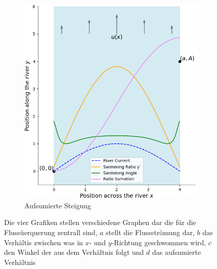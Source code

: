 \begin{figure}
\begin{subfigure}{0.48\textwidth}
        \includegraphics[width=\textwidth]{papers/schwimmen/Grafiken/Figure_5-crop.png}	
        \caption{Aufsumierte Steigung}
        \label{fig:sin_velocity}
    \end{subfigure}
    \par\bigskip
    \caption{Die vier Grafiken stellen verschiedene Graphen dar die für die Flussüerquerung zentrall sind, \(a\) stellt die Flussströmung dar, \(b\) das Verhältis zwischen was in \(x\)- und \(y\)-Richtung geschwommen wird, \(c\) den Winkel der aus dem Verhältnis folgt und \(d\) das aufsumierte Verhältnis}
    \label{fig:river_pfrofiles}
\end{figure}
